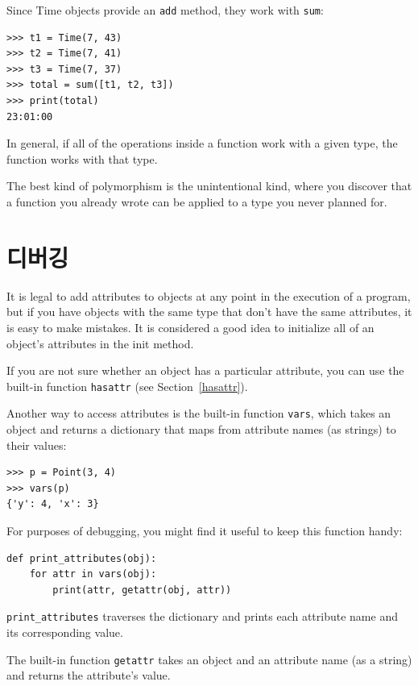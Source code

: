 \documentclass[10pt]{book}
\begin{document}
Since Time objects provide an {\tt add} method, they work
with {\tt sum}:

\begin{verbatim}
>>> t1 = Time(7, 43)
>>> t2 = Time(7, 41)
>>> t3 = Time(7, 37)
>>> total = sum([t1, t2, t3])
>>> print(total)
23:01:00
\end{verbatim}
%
In general, if all of the operations inside a function 
work with a given type, the function works with that type.

The best kind of polymorphism is the unintentional kind, where
you discover that a function you already wrote can be
applied to a type you never planned for.


\section{디버깅}

It is legal to add attributes to objects at any point in the execution
of a program, but if you have objects with the same type that don't
have the same attributes, it is easy to make mistakes.
It is considered a good idea to
initialize all of an object's attributes in the init method.

If you are not sure whether an object has a particular attribute, you
can use the built-in function {\tt hasattr} (see Section~\ref{hasattr}).

Another way to access attributes is the built-in function {\tt vars},
which takes an object and returns a dictionary that maps from
attribute names (as strings) to their values:

\begin{verbatim}
>>> p = Point(3, 4)
>>> vars(p)
{'y': 4, 'x': 3}
\end{verbatim}
%
For purposes of debugging, you might find it useful to keep this
function handy:

\begin{verbatim}
def print_attributes(obj):
    for attr in vars(obj):
        print(attr, getattr(obj, attr))
\end{verbatim}
%
\verb"print_attributes" traverses the dictionary
and prints each attribute name and its corresponding value.

The built-in function {\tt getattr} takes an object and an attribute
name (as a string) and returns the attribute's value.
\end{document}
